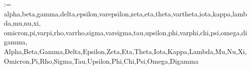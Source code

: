 \usepackage{mathrsfs}  %

\newcommand{\omicron}{o}
\newcommand{\Digamma}{F}
\newcommand{\Alpha}  {A}
\newcommand{\Beta}   {B}
\newcommand{\Epsilon}{E}
\newcommand{\Zeta}   {Z}
\newcommand{\Eta}    {H}
\newcommand{\Iota}   {I}
\newcommand{\Kappa}  {K}
\newcommand{\Mu}     {M}
\newcommand{\Nu}     {N}
\newcommand{\Omicron}{O}
\newcommand{\Rho}    {P}
\newcommand{\Tau}    {T}
\newcommand{\Chi}    {X}

\makeatletter
\@for\@tempa:=%
	alpha,beta,gamma,delta,epsilon,varepsilon,zeta,eta,theta,vartheta,iota,kappa,lambda,mu,nu,xi,%
	omicron,pi,varpi,rho,varrho,sigma,varsigma,tau,upsilon,phi,varphi,chi,psi,omega,digamma,%
	Alpha,Beta,Gamma,Delta,Epsilon,Zeta,Eta,Theta,Iota,Kappa,Lambda,Mu,Nu,Xi,%
	Omicron,Pi,Rho,Sigma,Tau,Upsilon,Phi,Chi,Psi,Omega,Digamma%
\do{%
	\expandafter\let\csname\@tempa orig\expandafter\endcsname\csname\@tempa\endcsname%
	\expandafter\let\csname\@tempa uporig\expandafter\endcsname\csname\@tempa up\endcsname%
}%
\newcommand*{\upgreekletters}{%
	\@for\@tempa:=%
		alpha,beta,gamma,delta,epsilon,varepsilon,zeta,eta,theta,vartheta,iota,kappa,lambda,mu,nu,xi,%
		omicron,pi,varpi,rho,varrho,sigma,varsigma,tau,upsilon,phi,varphi,chi,psi,omega,digamma,%
		Alpha,Beta,Gamma,Delta,Epsilon,Zeta,Eta,Theta,Iota,Kappa,Lambda,Mu,Nu,Xi,%
		Omicron,Pi,Rho,Sigma,Tau,Upsilon,Phi,Chi,Psi,Omega,Digamma%
	\do{%
		\expandafter\let\csname\@tempa\expandafter\endcsname\csname\@tempa up\endcsname%
	}%
}
\newcommand*{\itgreekletters}{%
	\@for\@tempa:=%
		alpha,beta,gamma,delta,epsilon,varepsilon,zeta,eta,theta,vartheta,iota,kappa,lambda,mu,nu,xi,%
		omicron,pi,varpi,rho,varrho,sigma,varsigma,tau,upsilon,phi,varphi,chi,psi,omega,digamma,%
		Alpha,Beta,Gamma,Delta,Epsilon,Zeta,Eta,Theta,Iota,Kappa,Lambda,Mu,Nu,Xi,%
		Omicron,Pi,Rho,Sigma,Tau,Upsilon,Phi,Chi,Psi,Omega,Digamma%
	\do{%
		\expandafter\let\csname\@tempa\expandafter\endcsname\csname\@tempa orig\endcsname%
	}%
}
\makeatother

\newcommand{\mathup}[1]{\upgreekletters\mathrm{#1}\itgreekletters}

\renewcommand{\mathbf}[1]{\bm{#1}}
\newcommand{\mathbfit}[1]{\mathbf{\mathit{#1}}}
\newcommand{\mathbfup}[1]{\upgreekletters\mathbf{\mathrm{#1}}\itgreekletters}

\AtBeginDocument{%
	\newcommand*{\euro}[1]{%
		\relax\ifmmode\text{\texteuro}#1\else\texteuro #1\fi%
	}%
}
